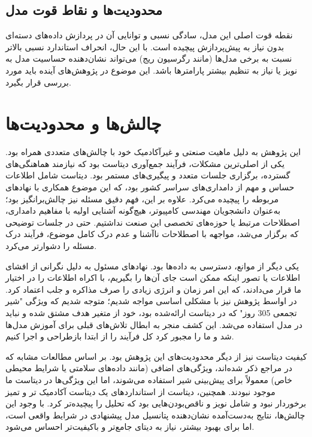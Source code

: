 \subsection{محدودیت‌ها و نقاط قوت مدل}
نقطه قوت اصلی این مدل، سادگی نسبی و توانایی آن در پردازش داده‌های دسته‌ای بدون نیاز به پیش‌پردازش پیچیده است. با این حال، انحراف استاندارد نسبی بالاتر نسبت به برخی مدل‌ها (مانند رگرسیون ریج) می‌تواند نشان‌دهنده حساسیت مدل به نویز یا نیاز به تنظیم بیشتر پارامترها باشد. این موضوع در پژوهش‌های آینده باید مورد بررسی قرار بگیرد.

\section{چالش‌ها و محدودیت‌ها}

این پژوهش به دلیل ماهیت صنعتی و غیرآکادمیک خود با چالش‌های متعددی همراه بود. یکی از اصلی‌ترین مشکلات، فرآیند جمع‌آوری دیتاست بود که نیازمند هماهنگی‌های گسترده، برگزاری جلسات متعدد و پیگیری‌های مستمر بود. دیتاست شامل اطلاعات حساس و مهم از دامداری‌های سراسر کشور بود، که این موضوع همکاری با نهادهای مربوطه را پیچیده می‌کرد. علاوه بر این، فهم دقیق مسئله نیز چالش‌برانگیز بود؛ به‌عنوان دانشجویان مهندسی کامپیوتر، هیچ‌گونه آشنایی اولیه با مفاهیم دامداری، اصطلاحات مرتبط یا حوزه‌های تخصصی این صنعت نداشتیم. حتی در جلسات توضیحی که برگزار می‌شد، مواجهه با اصطلاحات ناآشنا و عدم درک کامل موضوع، فرآیند درک مسئله را دشوارتر می‌کرد.

یکی دیگر از موانع، دسترسی به داده‌ها بود. نهادهای مسئول به دلیل نگرانی از افشای اطلاعات یا تصور اینکه ممکن است جای آن‌ها را بگیریم، با اکراه اطلاعات را در اختیار ما قرار می‌دادند، که این امر زمان و انرژی زیادی را صرف مذاکره و جلب اعتماد کرد. در اواسط پژوهش نیز با مشکلی اساسی مواجه شدیم؛ متوجه شدیم که ویژگی "شیر تجمعی 305 روز" که در دیتاست ارائه‌شده بود، خود از متغیر هدف مشتق شده و نباید در مدل استفاده می‌شد. این کشف منجر به ابطال تلاش‌های قبلی برای آموزش مدل‌ها شد و ما را مجبور کرد کل فرآیند را از ابتدا بازطراحی و اجرا کنیم.

کیفیت دیتاست نیز از دیگر محدودیت‌های این پژوهش بود. بر اساس مطالعات مشابه که در مراجع ذکر شده‌اند، ویژگی‌های اضافی (مانند داده‌های سلامتی یا شرایط محیطی خاص) معمولاً برای پیش‌بینی شیر استفاده می‌شوند، اما این ویژگی‌ها در دیتاست ما موجود نبودند. همچنین، دیتاست از استانداردهای یک دیتاست آکادمیک تر و تمیز برخوردار نبود و شامل نویز و ناقص‌بودن‌هایی بود که تحلیل را پیچیده‌تر کرد. با وجود این چالش‌ها، نتایج به‌دست‌آمده نشان‌دهنده پتانسیل مدل پیشنهادی در شرایط واقعی است، اما برای بهبود بیشتر، نیاز به دیتای جامع‌تر و باکیفیت‌تر احساس می‌شود.


